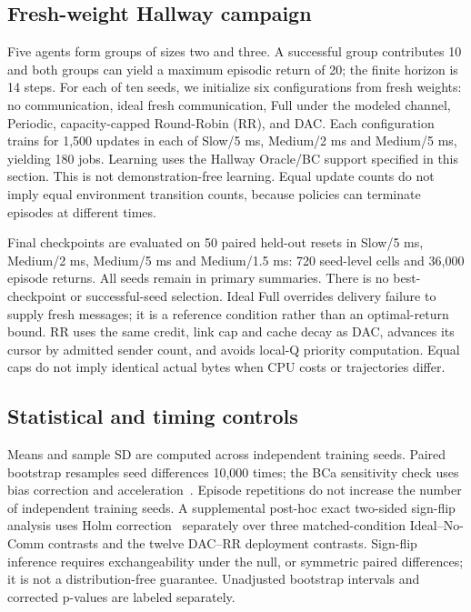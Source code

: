 \documentclass[10pt,a4paper]{article}
\begin{document}
\subsection{Fresh-weight Hallway campaign}
Five agents form groups of sizes two and three. A successful group contributes 10 and both groups can yield a maximum episodic return of 20; the finite horizon is 14 steps. For each of ten seeds, we initialize six configurations from fresh weights: no communication, ideal fresh communication, Full under the modeled channel, Periodic, capacity-capped Round-Robin (RR), and DAC. Each configuration trains for 1,500 updates in each of Slow/5 ms, Medium/2 ms and Medium/5 ms, yielding 180 jobs. Learning uses the Hallway Oracle/BC support specified in this section. This is not demonstration-free learning. Equal update counts do not imply equal environment transition counts, because policies can terminate episodes at different times.

Final checkpoints are evaluated on 50 paired held-out resets in Slow/5 ms, Medium/2 ms, Medium/5 ms and Medium/1.5 ms: 720 seed-level cells and 36,000 episode returns. All seeds remain in primary summaries. There is no best-checkpoint or successful-seed selection. Ideal Full overrides delivery failure to supply fresh messages; it is a reference condition rather than an optimal-return bound. RR uses the same credit, link cap and cache decay as DAC, advances its cursor by admitted sender count, and avoids local-Q priority computation. Equal caps do not imply identical actual bytes when CPU costs or trajectories differ.

\subsection{Statistical and timing controls}
Means and sample SD are computed across independent training seeds. Paired bootstrap resamples seed differences 10,000 times; the BCa sensitivity check uses bias correction and acceleration~\citep{efron1987better}. Episode repetitions do not increase the number of independent training seeds. A supplemental post-hoc exact two-sided sign-flip analysis uses Holm correction~\citep{holm1979simple} separately over three matched-condition Ideal--No-Comm contrasts and the twelve DAC--RR deployment contrasts. Sign-flip inference requires exchangeability under the null, or symmetric paired differences; it is not a distribution-free guarantee. Unadjusted bootstrap intervals and corrected p-values are labeled separately.
\end{document}
